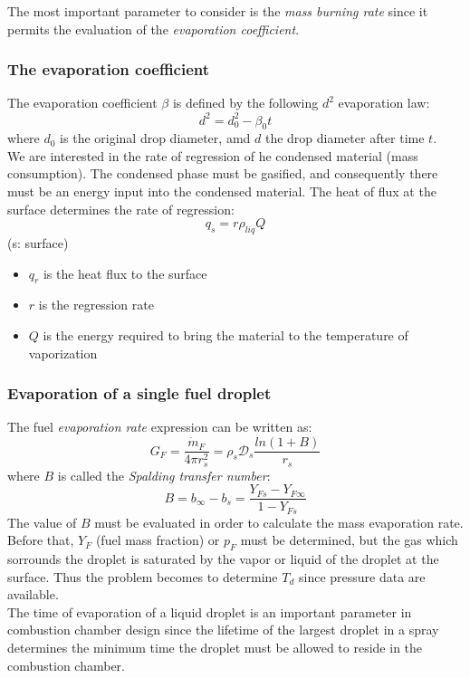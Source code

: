 \documentclass[12pt]{article}
\begin{document}
The most important parameter to consider is the \textit{mass burning rate} since it permits the evaluation of the \textit{evaporation coefficient}.

\subsubsection{The evaporation coefficient}

The evaporation coefficient $\beta$ is defined by the following $d^{2}$ evaporation law:
\begin{equation}
    d^{2}=d_{0}^{2}-\beta_{0}t
\end{equation}
where $d_{0}$ is the original drop diameter, amd $d$ the drop diameter after time $t$.\\
We are interested in the rate of regression of he condensed material (mass consumption). The condensed phase must be gasified, and consequently there must be an energy input into the condensed material. The heat of flux at the surface determines the rate of regression:
\begin{equation}
    q_{s}=r\rho_{liq}Q
\end{equation}
(s: surface)
\begin{itemize}
    \item $q_{r}$ is the heat flux to the surface
    \item $r$ is the regression rate
    \item $Q$ is the energy required to bring the material to the temperature of vaporization
\end{itemize}

\subsubsection{Evaporation of a single fuel droplet}

The fuel \textit{evaporation rate} expression can be written as:
\begin{equation}
    G_{F}=\frac{\dot{m}_{F}}{4\pi r_{s}^{2}}=\rho_{s}\mathcal{D}_{s}\frac{ln(1+B)}{r_{s}}
\end{equation}
 where $B$ is called the \textit{Spalding transfer number}:
 \begin{equation}
     B=b_{\infty}-b_{s}=\frac{Y_{Fs}-Y_{F\infty}}{1-Y_{Fs}}
 \end{equation}
 The value of $B$ must be evaluated in order to calculate the mass evaporation rate. Before that, $Y_{F}$ (fuel mass fraction) or $p_{F}$ must be determined, but the gas which sorrounds the droplet is saturated by the vapor or liquid of the droplet at the surface. Thus the problem becomes to determine $T_{d}$ since pressure data are available.\\
 The time of evaporation of a liquid droplet is an important parameter in combustion chamber design since the lifetime of the largest droplet in a spray determines the minimum time the droplet must be allowed to reside in the combustion chamber.
\end{document}
